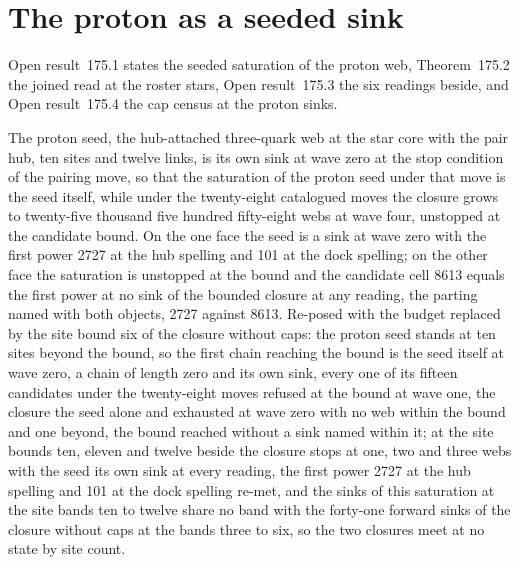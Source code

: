 \section{The proton as a seeded sink}\label{mod:VII-4-proton-as-a-seeded-sink}
\label{narr:open:7-4}Open result~175.1 states the seeded saturation of the proton web, Theorem~175.2 the joined read at the roster stars, Open result~175.3 the six readings beside, and Open result~175.4 the cap census at the proton sinks.
\begin{chwall}\label{box:VII-4-proton-as-a-seeded-sink:1}
The proton seed, the hub-attached three-quark web at the star core with the pair hub, ten sites and twelve links, is its own sink at wave zero at the stop condition of the pairing move, so that the saturation of the proton seed under that move is the seed itself, while under the twenty-eight catalogued moves the closure grows to twenty-five thousand five hundred fifty-eight webs at wave four, unstopped at the candidate bound. On the one face the seed is a sink at wave zero with the first power 2727 at the hub spelling and 101 at the dock spelling; on the other face the saturation is unstopped at the bound and the candidate cell 8613 equals the first power at no sink of the bounded closure at any reading, the parting named with both objects, 2727 against 8613. Re-posed with the budget replaced by the site bound six of the closure without caps: the proton seed stands at ten sites beyond the bound, so the first chain reaching the bound is the seed itself at wave zero, a chain of length zero and its own sink, every one of its fifteen candidates under the twenty-eight moves refused at the bound at wave one, the closure the seed alone and exhausted at wave zero with no web within the bound and one beyond, the bound reached without a sink named within it; at the site bounds ten, eleven and twelve beside the closure stops at one, two and three webs with the seed its own sink at every reading, the first power 2727 at the hub spelling and 101 at the dock spelling re-met, and the sinks of this saturation at the site bands ten to twelve share no band with the forty-one forward sinks of the closure without caps at the bands three to six, so the two closures meet at no state by site count.
\end{chwall}
